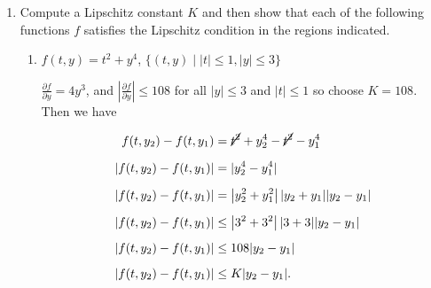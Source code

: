 \documentclass[11pt,oneside,english]{amsart}
\theoremstyle{definition}
\newcommand{\pp}[2]{\frac{\partial{#1}}{\partial{#2}}}
\begin{document}
\begin{enumerate}
\[
y(t)=y_0+z_0t-\int_0^t(t-s)g(s,y(s))\,ds.
\]

\begin{proof}
Utilizing the hint, integrating both sides of the equation above yields

\begin{align*}
\int_0^s y''+g(\tau,y)\,d\tau&=\int 0\,d\tau\\[2mm]
y'(s)-y'(0)+\int_0^s g(\tau,y)\,d\tau&=0\\[2mm]
y'(s)-z_0+\int_0^sg(\tau,y)\,d\tau&=0\\[2mm]
\int_0^t y'(s)-z_0\,ds+\int_0^t\int_0^sg(\tau,y)\,d\tau\,ds&=0\\[2mm]
y(t)-y(0)-z_0(t-0)+\int_0^t\int_0^sg(\tau,y)\,d\tau\,ds&=0\\[2mm]
y(t)-y_0-z_0t+\int_0^t\left(\int_\tau^t\,ds\right)g(\tau,y)\,d\tau&=0\\[2mm]
y(t)-y_0-z_0t+\int_0^t(t-\tau)g(\tau,y)\,d\tau&=0.
\end{align*}

Moving every term but $y(t)$ to the right hand side and changing $\tau$ to $s$, we have 

\[
y(t)=y_0+z_0t-\int_0^t(t-s)g(s,y(s))\,ds.
\]
\end{proof}


\item Compute a Lipschitz constant $K$ and then show that each of the following functions $f$ satisfies the Lipschitz condition in the regions indicated.

\begin{enumerate}
\item $f(t,y)=t^2+y^4$, $\{(t,y)\mid |t|\leq 1, |y|\leq3\}$

$\displaystyle \pp{f}{y}=4y^3$, and $\displaystyle \left|\pp{f}{y}\right|\leq108$ for all $|y|\leq3$ and $|t|\leq 1$ so choose $K=108$. Then we have 

\begin{align*}
f(t,y_2)-f(t,y_1)&=\cancel{t^2}+y_2^4-\cancel{t^2}-y_1^4\\[2mm]
\left|f(t,y_2)-f(t,y_1)\right|&=|y_2^4-y_1^4|\\[2mm]
\left|f(t,y_2)-f(t,y_1)\right|&=\left|y_2^2+y_1^2\right||y_2+y_1||y_2-y_1|\\[2mm]
\left|f(t,y_2)-f(t,y_1)\right|&\leq\left|3^2+3^2\right||3+3||y_2-y_1|\\[2mm]
\left|f(t,y_2)-f(t,y_1)\right|&\leq108|y_2-y_1|\\[2mm]
\left|f(t,y_2)-f(t,y_1)\right|&\leq K|y_2-y_1|.\\[2mm]
\end{align*}


\end{enumerate}
\end{enumerate}
\end{document}
